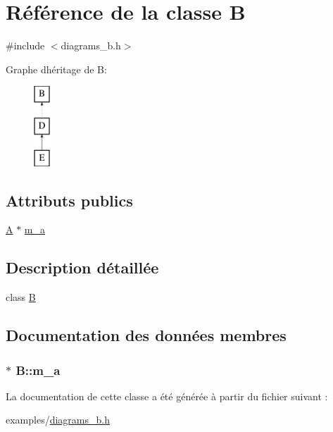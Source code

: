 \hypertarget{class_b}{}\section{Référence de la classe B}
\label{class_b}


{\ttfamily \#include $<$diagrams\+\_\+b.\+h$>$}

Graphe d\textquotesingle{}héritage de B\+:\begin{figure}[H]
\begin{center}
\leavevmode
\includegraphics[height=3.000000cm]{class_b}
\end{center}
\end{figure}
\subsection*{Attributs publics}
\begin{DoxyCompactItemize}
\item 
\hyperlink{class_a}{A} $\ast$ \hyperlink{class_b_a26c70b64fe7cf17fcced7755ecff7537}{m\+\_\+a}
\end{DoxyCompactItemize}


\subsection{Description détaillée}
class \hyperlink{class_b}{B} 

\subsection{Documentation des données membres}
\hypertarget{class_b_a26c70b64fe7cf17fcced7755ecff7537}{}
\subsubsection[{m\+\_\+a}]{$\ast$ B\+::m\+\_\+a}\label{class_b_a26c70b64fe7cf17fcced7755ecff7537}


La documentation de cette classe a été générée à partir du fichier suivant \+:\begin{DoxyCompactItemize}
\item 
examples/\hyperlink{diagrams__b_8h}{diagrams\+\_\+b.\+h}\end{DoxyCompactItemize}

